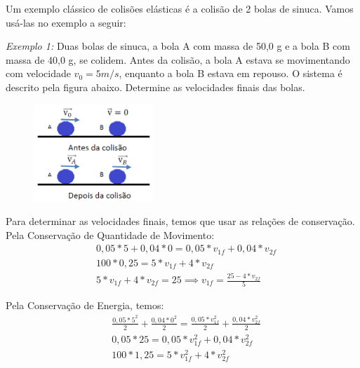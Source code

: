 \documentclass[12pt]{extarticle}
\newcommand{\<}{\langle}
\renewcommand{\>}{\rangle}
\theoremstyle{definition}
\begin{document}
Um exemplo clássico de colisões elásticas é a colisão de 2 bolas de sinuca. Vamos usá-las no exemplo a seguir:

\textit{Exemplo 1:} Duas bolas de sinuca, a bola A com massa de 50,0 g e a bola B com massa de 40,0 g, se colidem. Antes da colisão, a bola A estava se movimentando com velocidade $v_0 = 5 m/s$, enquanto a bola B estava em repouso. O sistema é descrito pela figura abaixo. Determine as velocidades finais das bolas.

\begin{figure}[H]
    \centering
    \includegraphics[width=0.4\textwidth]{elastica.png}
    \label{fig:ex_1}
\end{figure}

Para determinar as velocidades finais, temos que usar as relações de conservação. Pela Conservação de Quantidade de Movimento:
\begin{equation}\label{eq:ex_1}
    \begin{split}
        &0,05*5 + 0,04*0 = 0,05*v_{1f} + 0,04*v_{2f}\\
        &100*0,25 = 5*v_{1f} + 4*v_{2f}\\
        &5*v_{1f} + 4*v_{2f} = 25 \implies \boxed{v_{1f} = \frac{25 - 4*v_{2f}}{5}}
    \end{split}
\end{equation}

Pela Conservação de Energia, temos:
\begin{equation}
    \begin{split}
        &\frac{0,05*5^2}{2} + \frac{0,04*0^2}{2} = \frac{0,05*v_{1f}^2}{2} + \frac{0,04*v_{2f}^2}{2}\\
        &0,05*25 = 0,05*v_{1f}^2 + 0,04*v_{2f}^2\\
        &100*1,25= 5*v_{1f}^2 + 4*v_{2f}^2
    \end{split}
\end{equation}
\end{document}
